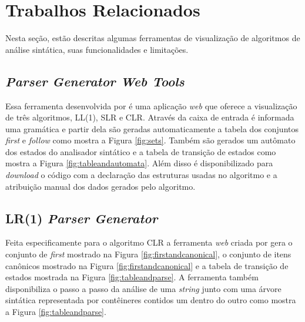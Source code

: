 \chapter{Trabalhos Relacionados}
\label{cap:trabalhos-relacionados}

Nesta seção, estão descritas algumas ferramentas de visualização de algoritmos de análise sintática, suas funcionalidades e limitações.

\section{\textit{Parser Generator Web Tools}}
\label{sec:trabalho-relacionado-a}

Essa ferramenta desenvolvida por \textcite{Parser-2024-04-12} é uma aplicação \textit{web} que oferece a visualização de três algoritmos, LL(1), SLR e CLR. Através da caixa de entrada é informada uma gramática e partir dela são geradas automaticamente a tabela dos conjuntos \textit{first} e \textit{follow} como mostra a Figura \ref{fig:sets}. Também são gerados um autômato dos estados do analisador sintático e a tabela de transição de estados como mostra a Figura \ref{fig:tableandautomata}. Além disso é disponibilizado para \textit{download} o código com a declaração das estruturas usadas no algoritmo e a atribuição manual dos dados gerados pelo algoritmo.

\begin{figure}[ht]
    \captionsetup{width=16cm}
\end{figure}

\section{LR(1) \textit{Parser Generator}}
Feita especificamente para o algoritmo CLR a ferramenta \textit{web} criada por \textcite{LR-2024-04-12} gera o conjunto de \textit{first} mostrado na Figura \ref{fig:firstandcanonical}, o conjunto de itens canônicos mostrado na Figura \ref{fig:firstandcanonical} e a tabela de transição de estados mostrada na Figura \ref{fig:tableandparse}. A ferramenta também disponibiliza o passo a passo da análise de uma \textit{string} junto com uma árvore sintática representada por contêineres contidos um dentro do outro como mostra a Figura \ref{fig:tableandparse}.


